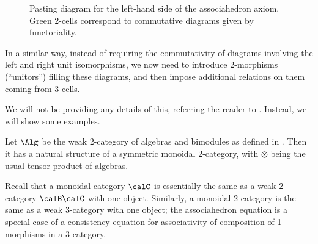 \begin{figure}[ht]
\begin{center}
	\end{center}
	\caption{Pasting diagram for the left-hand side of the associahedron axiom.
    Green 2-cells correspond to commutative diagrams given by functoriality.}
	\label{f: associahedron}
\end{figure}

In a similar way, instead of requiring the commutativity of diagrams involving
the left and right unit isomorphisms, we now need to introduce 2-morphisms
(``unitors'') filling these diagrams, and then impose additional relations on
them coming from 3-cells.

We will not be providing any details of this, referring the reader to
\cite{schommer-pries}. Instead, we will show some examples.


\begin{example}\label{x:alg-bimodules}
  Let $\Alg$ be the weak 2-category of algebras and bimodules as defined in
  . Then it has a natural structure of a symmetric monoidal
  2-category, with $\otimes$ being the usual tensor product of algebras.
\end{example}

\begin{remark}
  Recall that a monoidal category $\calC$ is essentially the same as a
  weak 2-category $\calB\calC$ with one object. Similarly, a monoidal
  2-category is the same as a weak 3-category with one object; the
  associahedron equation is a special case of a consistency equation for
  associativity of composition of 1-morphisms in a 3-category.
\end{remark}



